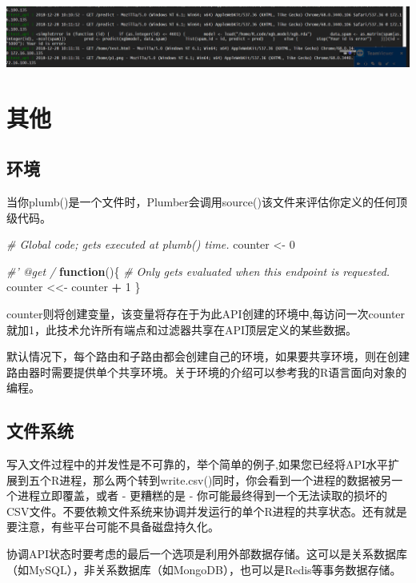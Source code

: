 \documentclass[]{book}
\newenvironment{Shaded}{\begin{snugshade}}{\end{snugshade}}
\newcommand{\DecValTok}[1]{\textcolor[rgb]{0.00,0.00,0.81}{#1}}
\newcommand{\StringTok}[1]{\textcolor[rgb]{0.31,0.60,0.02}{#1}}
\newcommand{\CommentTok}[1]{\textcolor[rgb]{0.56,0.35,0.01}{\textit{#1}}}
\newcommand{\ControlFlowTok}[1]{\textcolor[rgb]{0.13,0.29,0.53}{\textbf{#1}}}
\newcommand{\OperatorTok}[1]{\textcolor[rgb]{0.81,0.36,0.00}{\textbf{#1}}}
\newcommand{\NormalTok}[1]{#1}
\begin{document}
\includegraphics{pic/plumber/7.png}

\section{其他}

\subsection{环境}

当你plumb()是一个文件时，Plumber会调用source()该文件来评估你定义的任何顶级代码。

\begin{Shaded}
\begin{Highlighting}[]
\CommentTok{# Global code; gets executed at plumb() time.}
\NormalTok{counter <-}\StringTok{ }\DecValTok{0}

\CommentTok{#' @get /}
\ControlFlowTok{function}\NormalTok{()\{}
  \CommentTok{# Only gets evaluated when this endpoint is requested.}
\NormalTok{  counter <<-}\StringTok{ }\NormalTok{counter }\OperatorTok{+}\StringTok{ }\DecValTok{1}
\NormalTok{\}}
\end{Highlighting}
\end{Shaded}

counter则将创建变量，该变量将存在于为此API创建的环境中,每访问一次counter就加1，此技术允许所有端点和过滤器共享在API顶层定义的某些数据。

默认情况下，每个路由和子路由都会创建自己的环境，如果要共享环境，则在创建路由器时需要提供单个共享环境。关于环境的介绍可以参考我的R语言面向对象的编程。

\subsection{文件系统}

写入文件过程中的并发性是不可靠的，举个简单的例子,如果您已经将API水平扩展到五个R进程，那么两个转到write.csv()同时，你会看到一个进程的数据被另一个进程立即覆盖，或者
- 更糟糕的是 -
你可能最终得到一个无法读取的损坏的CSV文件。不要依赖文件系统来协调并发运行的单个R进程的共享状态。还有就是要注意，有些平台可能不具备磁盘持久化。

协调API状态时要考虑的最后一个选项是利用外部数据存储。这可以是关系数据库（如MySQL），非关系数据库（如MongoDB），也可以是Redis等事务数据存储。
\end{document}

